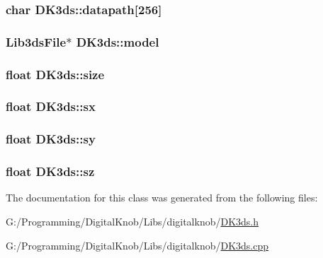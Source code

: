 \hypertarget{class_d_k3ds_a11931ab3ae1f6ec845642b6ce7b1193b}{
\subsubsection[{datapath}]{\setlength{\rightskip}{0pt plus 5cm}char D\-K3ds\-::datapath\mbox{[}256\mbox{]}}}\label{class_d_k3ds_a11931ab3ae1f6ec845642b6ce7b1193b}
\hypertarget{class_d_k3ds_a29b89506bbbb2c3e7fe7819c60a421a3}{
\subsubsection[{model}]{\setlength{\rightskip}{0pt plus 5cm}Lib3ds\-File$\ast$ D\-K3ds\-::model}}\label{class_d_k3ds_a29b89506bbbb2c3e7fe7819c60a421a3}
\hypertarget{class_d_k3ds_a5ec0d86a7237b2cc00298287cfd89403}{
\subsubsection[{size}]{\setlength{\rightskip}{0pt plus 5cm}float D\-K3ds\-::size}}\label{class_d_k3ds_a5ec0d86a7237b2cc00298287cfd89403}
\hypertarget{class_d_k3ds_a5cdfe11fe1f186a4658f53ea87212d91}{
\subsubsection[{sx}]{\setlength{\rightskip}{0pt plus 5cm}float D\-K3ds\-::sx}}\label{class_d_k3ds_a5cdfe11fe1f186a4658f53ea87212d91}
\hypertarget{class_d_k3ds_ab47839ed130f6ca5cc997a1dd89ddf39}{
\subsubsection[{sy}]{\setlength{\rightskip}{0pt plus 5cm}float D\-K3ds\-::sy}}\label{class_d_k3ds_ab47839ed130f6ca5cc997a1dd89ddf39}
\hypertarget{class_d_k3ds_aea27dedf0d069c6bfce3ed166ab5370c}{
\subsubsection[{sz}]{\setlength{\rightskip}{0pt plus 5cm}float D\-K3ds\-::sz}}\label{class_d_k3ds_aea27dedf0d069c6bfce3ed166ab5370c}


The documentation for this class was generated from the following files\-:\begin{DoxyCompactItemize}
\item 
G\-:/\-Programming/\-Digital\-Knob/\-Libs/digitalknob/\hyperlink{_d_k3ds_8h}{D\-K3ds.\-h}\item 
G\-:/\-Programming/\-Digital\-Knob/\-Libs/digitalknob/\hyperlink{_d_k3ds_8cpp}{D\-K3ds.\-cpp}\end{DoxyCompactItemize}
